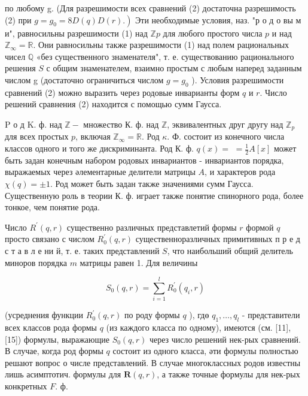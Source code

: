 \documentclass[10pt]{article}
\begin{document}
по любому g. (Для разрешимости всех сравнений (2) достаточна разрешимость (2) при $\left.g=g_{0}=8 D(q) D(r).\right)$ Эти необходимые условия, наз. "р о д о вы м и", равносильны разрешимости (1) над $\mathbb{Z} p$ для любого простого числа $p$ и над $\mathbb{Z}_{\infty}=\mathbb{R}$. Они равносильны также разрешимости (1) над полем рациональных чисел $\mathbb{Q}$ «без существенного знаменателя", т. е. существованию рационального решения $S$ с общим знаменателем, взаимно простым с любым наперед заданным числом g (достаточно ограничиться числом $g=g_{0}$ ). Условия разрешимости сравнений (2) можно выразить через родовые инварианты форм $q$ и $r$. Число решений сравнения (2) находится с помощью сумм Гаусса.



$\mathrm{P}$ о д $\mathrm{K}$. ф. над $\mathbb{Z}-$ множество $К$. ф. над $\mathbb{Z}$, эквивалентных друг другу над $\mathbb{Z}_{p}$ для всех простых $p$, включая $\mathbb{Z}_{\infty}=\mathbb{R}$. Род $\kappa$. Ф. состоит из конечного числа классов одного и того же дискриминанта. Род К. ф. $q(x)=$ $=\frac{1}{2} A[x]$ может быть задан конечным набором родовых инвариантов - инвариантов порядка, выражаемых через әлементарные делители матрицы $A$, и характеров рода $\chi(q)= \pm 1$. Род может быть задан также значениями сумм Гаусса. Существенную роль в теории К. ф. играет также понятие спинорного рода, более тонкое, чем понятие рода.



Число $R^{\prime}(q, r)$ существенно различных представлетий формы $r$ формой $q$ просто связано с числом $R_{0}^{\prime}(q, r)$ существенноразличных примитивных п р е д с т а в л е ни й, т. е. таких представлений $S$, что наибольший общий делитель миноров порядка $m$ матрицы равен 1. Для величины



\[

S_{0}(q, r)=\sum_{i=1}^{l} R_{0}^{\prime}\left(q_{i}, r\right)

\]



(усреднения функции $R_{0}^{\prime}(q, r)$ по роду формы $q$ ), гдө $q_{1}, \ldots, q_{l}$ - представители всех классов рода формы $q$ (из каждого класса по одному), имеются (см. [11], [15]) формулы, выражающие $S_{0}(q, r)$ через число решений нек-рых сравнений. В случае, когда род формы $q$ состоит из одного класса, әти формулы полностью решают вопрос о числе представлений. В случае многоклассных родов известны лишь асимптотич. формулы для $\boldsymbol{R}(q, r)$, а также точные формулы для нек-рых конкретных $F$. ф.
\end{document}

